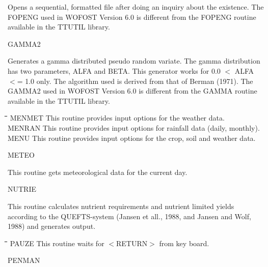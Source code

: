 \begin{indenting}{2.54cm}
Opens a sequential, formatted file after doing an inquiry about the exis\-tence. The FOPENG used in WOFOST Version 6.0 is different from the
FOPENG routine available in the TTUTIL library.
\end{indenting}
GAMMA2
\testlastline

\begin{indenting}{2.54cm}
Generates a gamma distributed pseudo random variate. The gamma distri\-bution has two parameters, ALFA and BETA. This generator works for
0.0 $<$ ALFA $<$= 1.0 only. The algorithm used is derived from that of
Berman (1971). The GAMMA2 used in WOFOST Version 6.0 is different
from the GAMMA routine available in the TTUTIL library.
\end{indenting}
\begin{tabbing}
\hspace{1.27cm}\=\hspace{1.27cm}\=\hspace{1.27cm}\=\hspace{1.27cm}\=%
\hspace{1.27cm}\=\hspace{1.27cm}\=\hspace{1.27cm}\=\hspace{1.27cm}\=%
\hspace{1.27cm}\=\hspace{1.27cm}\=\kill
MENMET\> \> This routine provides input options for the weather data.\\
MENRAN\> \> This routine provides input options for rainfall data (daily, monthly).\\
MENU\> \> This routine provides input options for the crop, soil and weather data.
\end{tabbing}
METEO
\testlastline

\begin{indenting}{2.54cm}
This routine gets meteorological data for the current day.
\end{indenting}
NUTRIE
\testlastline

\begin{indenting}{2.54cm}
This routine calculates nutrient requirements and nutrient limited yields
according to the QUEFTS-system (Jansen et all., 1988, and Jansen and
Wolf, 1988) and generates output.
\end{indenting}
\begin{tabbing}
\hspace{1.27cm}\=\hspace{1.27cm}\=\hspace{1.27cm}\=\hspace{1.27cm}\=%
\hspace{1.27cm}\=\hspace{1.27cm}\=\hspace{1.27cm}\=\hspace{1.27cm}\=%
\hspace{1.27cm}\=\hspace{1.27cm}\=\kill
PAUZE\> \> This routine waits for $<$RETURN$>$ from key board.
\end{tabbing}
PENMAN
\testlastline


